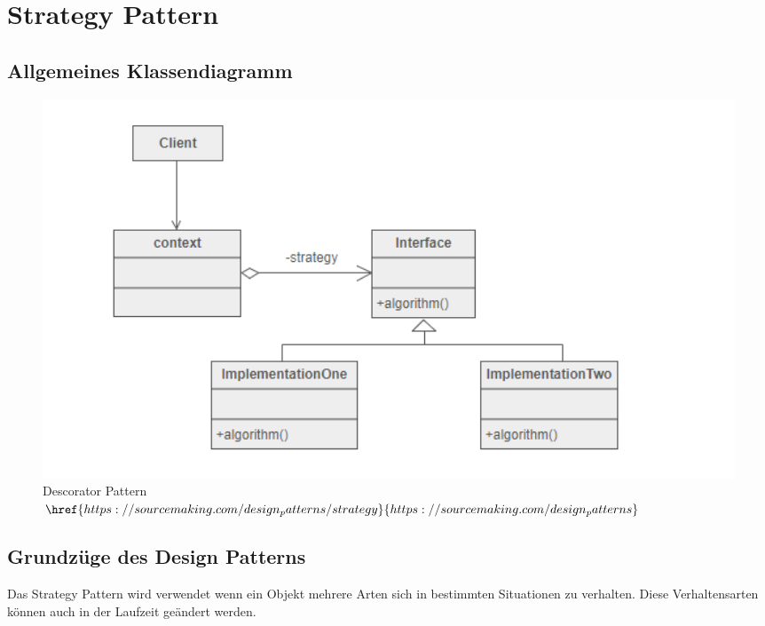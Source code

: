 \clearpage
\section{Strategy Pattern}
\subsection{Allgemeines Klassendiagramm}
\begin{figure}[H]
	\centering
	\includegraphics[width=1\textwidth]{images/Strategy.png}
	\caption{ Descorator Pattern \\ $\href{https://sourcemaking.com/design_patterns/strategy}{https://sourcemaking.com/design_patterns}$}
\end{figure}
\subsection{Grundzüge des Design Patterns}
Das Strategy Pattern wird verwendet wenn ein Objekt mehrere Arten sich in bestimmten Situationen zu verhalten. Diese Verhaltensarten können auch in der Laufzeit geändert werden. 
